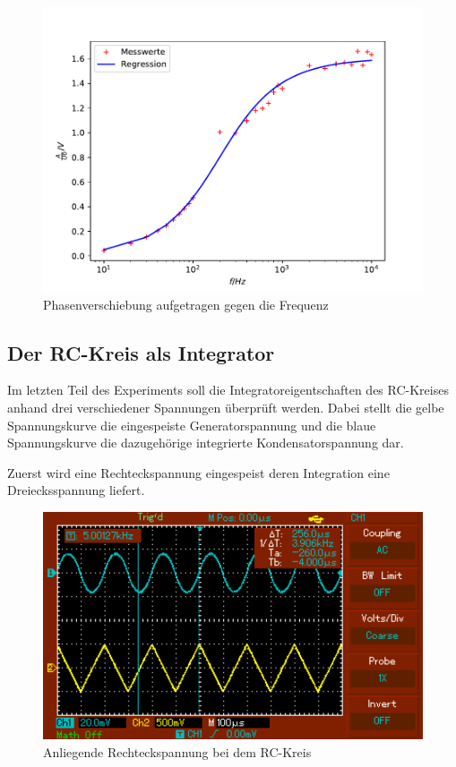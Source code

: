 \begin{figure}
  \centering
  \includegraphics[width = 12 cm]{Plot2.pdf}
  \caption{Phasenverschiebung aufgetragen gegen die Frequenz}
  \label{fig:Messungc}
\end{figure}

\newpage
\subsection{Der RC-Kreis als Integrator}
Im letzten Teil des Experiments soll die Integratoreigentschaften des RC-Kreises anhand
drei verschiedener Spannungen überprüft werden. Dabei stellt die gelbe Spannungskurve die eingespeiste
Generatorspannung und die blaue Spannungskurve die dazugehörige integrierte Kondensatorspannung dar.

Zuerst wird eine Rechteckspannung eingespeist deren Integration eine Dreiecksspannung liefert.
\begin{figure}
  \centering
  \includegraphics{rechteck.pdf}
  \caption{Anliegende Rechteckspannung bei dem RC-Kreis}
  \label{fig:Rechteck}
\end{figure}

